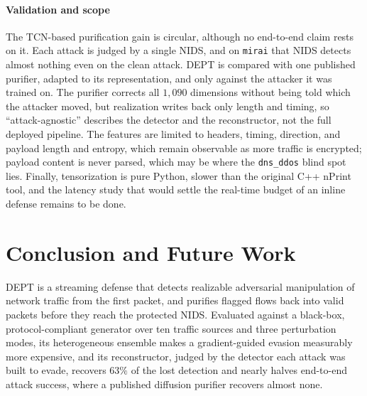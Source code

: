 \documentclass[acmtog,nonacm,pbalance]{acmart}
\newcommand{\src}[1]{\texttt{#1}}
\begin{document}
\paragraph{Validation and scope} The TCN-based purification gain is circular,
although no end-to-end claim rests on it. Each attack is judged by a single
NIDS, and on \src{mirai} that NIDS detects almost nothing even on the clean
attack. DEPT is compared with one published purifier, adapted to its
representation, and only against the attacker it was trained on. The purifier
corrects all $1{,}090$ dimensions without being told which the attacker moved,
but realization writes back only length and timing, so ``attack-agnostic''
describes the detector and the reconstructor, not the full deployed pipeline. The features
are limited to headers, timing, direction, and payload length and entropy, which
remain observable as more traffic is encrypted; payload content is never parsed,
which may be where the \src{dns\_ddos} blind spot lies. Finally, tensorization is
pure Python, slower than the original C++ nPrint tool, and the latency study that
would settle the real-time budget of an inline defense remains to be done.

\section{Conclusion and Future Work}\label{sec:conclusion}

DEPT is a streaming defense that detects realizable adversarial manipulation of
network traffic from the first packet, and purifies flagged flows back into
valid packets before they reach the protected NIDS. Evaluated against a
black-box, protocol-compliant generator over ten traffic sources and three
perturbation modes, its heterogeneous ensemble makes a gradient-guided evasion
measurably more expensive, and its reconstructor, judged by the detector each attack was
built to evade, recovers $63\%$ of the lost detection and nearly halves
end-to-end attack success, where a published diffusion purifier recovers almost
none.
\end{document}
